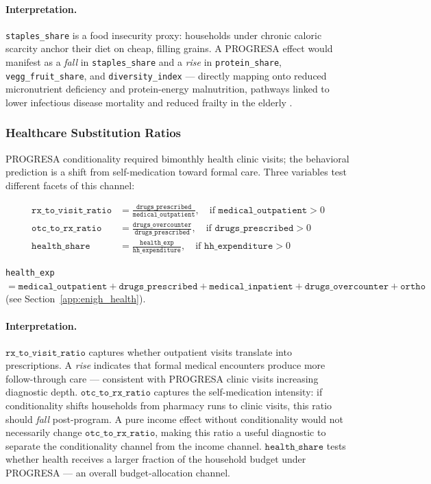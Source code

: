 \paragraph{Interpretation.}
\texttt{staples\_share} is a food insecurity proxy: households under chronic
caloric scarcity anchor their diet on cheap, filling grains. A PROGRESA effect
would manifest as a \emph{fall} in \texttt{staples\_share} and a
\emph{rise} in \texttt{protein\_share}, \texttt{vegg\_fruit\_share}, and
\texttt{diversity\_index} — directly mapping onto reduced micronutrient
deficiency and protein-energy malnutrition, pathways linked to lower
infectious disease mortality and reduced frailty in the elderly
\citep{leroy2008,barham2013}.

\subsubsection{Healthcare Substitution Ratios}
\label{app:enigh_healthcare_ratios}

PROGRESA conditionality required bimonthly health clinic visits; the
behavioral prediction is a shift from self-medication toward formal care.
Three variables test different facets of this channel:

\begin{align}
\texttt{rx\_to\_visit\_ratio}  &= \frac{\texttt{drugs\_prescribed}}
    {\texttt{medical\_outpatient}},
    \quad \text{if } \texttt{medical\_outpatient} > 0
    \label{eq:rx_visit} \\[4pt]
\texttt{otc\_to\_rx\_ratio}    &= \frac{\texttt{drugs\_overcounter}}
    {\texttt{drugs\_prescribed}},
    \quad \text{if } \texttt{drugs\_prescribed} > 0
    \label{eq:otc_rx} \\[4pt]
\texttt{health\_share}         &= \frac{\texttt{health\_exp}}
    {\texttt{hh\_expenditure}},
    \quad \text{if } \texttt{hh\_expenditure} > 0
    \label{eq:health_share}
\end{align}

\noindent
\texttt{health\_exp} $= \texttt{medical\_outpatient} + \texttt{drugs\_prescribed}
+ \texttt{medical\_inpatient} + \texttt{drugs\_overcounter} + \texttt{ortho}$
(see Section~\ref{app:enigh_health}).

\paragraph{Interpretation.}
$\texttt{rx\_to\_visit\_ratio}$ captures whether outpatient visits translate
into prescriptions. A \emph{rise} indicates that formal medical encounters
produce more follow-through care — consistent with PROGRESA clinic visits
increasing diagnostic depth. $\texttt{otc\_to\_rx\_ratio}$ captures the
self-medication intensity: if conditionality shifts households from pharmacy
runs to clinic visits, this ratio should \emph{fall} post-program. A pure
income effect without conditionality would not necessarily change
$\texttt{otc\_to\_rx\_ratio}$, making this ratio a useful diagnostic to
separate the conditionality channel from the income channel.
$\texttt{health\_share}$ tests whether health receives a larger fraction of
the household budget under PROGRESA — an overall budget-allocation channel.


